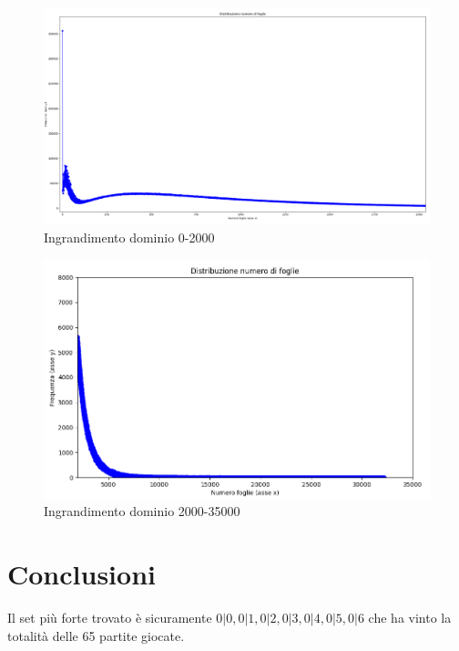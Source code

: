 \documentclass[a4paper,12pt]{report} %
\begin{document}
\begin{figure}[h!]
    \centering
    \includegraphics[width=1\textwidth]{imgs/grafico_0_2000.png} %
    \caption{Ingrandimento dominio 0-2000}
    \label{fig:etichetta}
\end{figure}

\begin{figure}[h!]
    \centering
    \includegraphics[width=1\textwidth]{imgs/grafico_2000_35000.png} %
    \caption{Ingrandimento dominio 2000-35000}
    \label{fig:etichetta}
\end{figure}




\chapter{Conclusioni}

Il set più forte trovato è sicuramente \(0|0, 0|1, 0|2, 0|3, 0|4, 0|5, 0|6\) che ha vinto la totalità delle 65 partite giocate.
\end{document}
